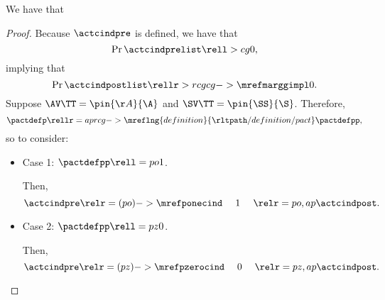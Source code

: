 \begin{proposition}
  \nrp
  We have that %
\end{proposition}

\begin{proof}
  \nrp
  Because $\actcindpre$ is defined,
  we have that 
  $$\Pr{\actcindprelist} \rell > cg 0,$$ 
  implying that
  \nrp
  $$\Pr{\actcindpostlist} \rellr > rcg {cg->\mrefmarggimpl} 0.$$
  Suppose 
  \nrp
  $\AV\TT = \pin{\AA}{\A}$
  and
  $\SV\TT = \pin{\SS}{\S}$. Therefore,
  $$\pactdefp \rellr = ap {rcg->\mreflng{definition}{\rltpath/definition/pact}} \pactdefpp,$$
  \nrp
  so  to consider:
  \begin{itemize}
    \item \nrp Case 1: $\pactdefpp \rell = po 1$.

      \nrp
      Then,
      $$\actcindpre \relr = (po)->{\mrefponecind} \ \ \ \ 1\ \ \ \ \relr = po,ap \actcindpost.$$
    \item \nrp Case 2: $\pactdefpp \rell = pz 0$.

      \nrp
      Then,
      $$\actcindpre \relr = (pz)->{\mrefpzerocind} \ \ \ \ 0\ \ \ \ \relr = pz,ap \actcindpost.$$
  \end{itemize}
\end{proof}
